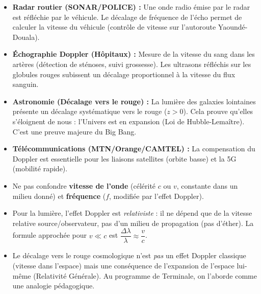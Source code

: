 \documentclass[11pt]{article}
\newcounter{popsec}
\newcounter{popsub}
\newcommand{\courssub}[1]{%
  \stepcounter{popsub}%
  \par\vspace{9pt}\noindent{\popxbold\fontsize{11.5}{13}\selectfont\color{popink}{\color{poporange}\thepopsec.\thepopsub}\hspace{6pt}#1}\par\nopagebreak\vspace{4pt}
}
\begin{document}
\begin{savaistu}
\begin{itemize}
\item \textbf{Radar routier (SONAR/POLICE) :} Une onde radio émise par le radar est réfléchie par le véhicule. Le décalage de fréquence de l'écho permet de calculer la vitesse du véhicule (contrôle de vitesse sur l'autoroute Yaoundé-Douala).
\item \textbf{Échographie Doppler (Hôpitaux) :} Mesure de la vitesse du sang dans les artères (détection de sténoses, suivi grossesse). Les ultrasons réfléchis sur les globules rouges subissent un décalage proportionnel à la vitesse du flux sanguin.
\item \textbf{Astronomie (Décalage vers le rouge) :} La lumière des galaxies lointaines présente un décalage systématique vers le rouge ($z > 0$). Cela prouve qu'elles s'éloignent de nous : l'Univers est en expansion (Loi de Hubble-Lemaître). C'est une preuve majeure du Big Bang.
\item \textbf{Télécommunications (MTN/Orange/CAMTEL) :} La compensation du Doppler est essentielle pour les liaisons satellites (orbite basse) et la 5G (mobilité rapide).
\end{itemize}
\end{savaistu}

\begin{attention}
\begin{itemize}
\item Ne pas confondre \textbf{vitesse de l'onde} (célérité $c$ ou $v$, constante dans un milieu donné) et \textbf{fréquence} ($f$, modifiée par l'effet Doppler).
\item Pour la lumière, l'effet Doppler est \emph{relativiste} : il ne dépend que de la vitesse relative source/observateur, pas d'un milieu de propagation (pas d'éther). La formule approchée pour $v \ll c$ est $\dfrac{\Delta \lambda}{\lambda} \approx \dfrac{v}{c}$.
\item Le décalage vers le rouge cosmologique n'est \emph{pas} un effet Doppler classique (vitesse dans l'espace) mais une conséquence de l'expansion de l'espace lui-même (Relativité Générale). Au programme de Terminale, on l'aborde comme une analogie pédagogique.
\end{itemize}
\end{attention}

\courssub{Bilan de l'activité}
\end{document}
